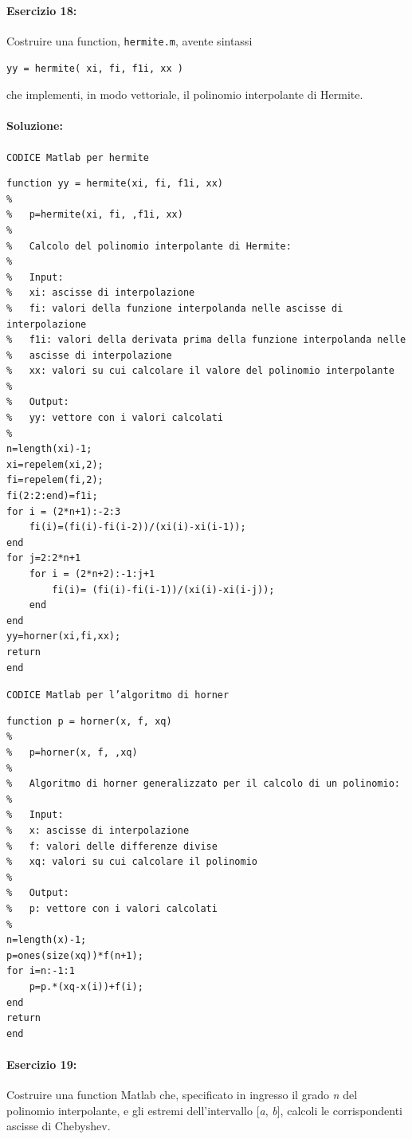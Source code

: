 \documentclass[12pt]{article}
\begin{document}
\paragraph{Esercizio 18:}
Costruire una function, \texttt{hermite.m}, avente sintassi
\begin{center}
    \texttt{yy = hermite( xi, fi, f1i, xx )}
\end{center}
che implementi, in modo vettoriale, il polinomio interpolante di Hermite.
\paragraph{Soluzione:}

\texttt{CODICE Matlab per hermite}
\begin{lstlisting}[frame=single]
function yy = hermite(xi, fi, f1i, xx)
%
%   p=hermite(xi, fi, ,f1i, xx)
%
%   Calcolo del polinomio interpolante di Hermite:
%
%   Input:
%   xi: ascisse di interpolazione
%   fi: valori della funzione interpolanda nelle ascisse di interpolazione
%   f1i: valori della derivata prima della funzione interpolanda nelle
%   ascisse di interpolazione
%   xx: valori su cui calcolare il valore del polinomio interpolante
%
%   Output:
%   yy: vettore con i valori calcolati
%
n=length(xi)-1;
xi=repelem(xi,2);
fi=repelem(fi,2);
fi(2:2:end)=f1i;
for i = (2*n+1):-2:3
    fi(i)=(fi(i)-fi(i-2))/(xi(i)-xi(i-1));
end
for j=2:2*n+1
    for i = (2*n+2):-1:j+1
        fi(i)= (fi(i)-fi(i-1))/(xi(i)-xi(i-j));
    end
end
yy=horner(xi,fi,xx);
return
end
\end{lstlisting}
\texttt{CODICE Matlab per l'algoritmo di horner}
\begin{lstlisting}[frame=single]
function p = horner(x, f, xq)
%
%   p=horner(x, f, ,xq)
%
%   Algoritmo di horner generalizzato per il calcolo di un polinomio:
%
%   Input:
%   x: ascisse di interpolazione
%   f: valori delle differenze divise
%   xq: valori su cui calcolare il polinomio
%
%   Output:
%   p: vettore con i valori calcolati
%
n=length(x)-1;
p=ones(size(xq))*f(n+1);
for i=n:-1:1
    p=p.*(xq-x(i))+f(i);
end
return
end
\end{lstlisting}
\paragraph{Esercizio 19:}
Costruire una function Matlab che, specificato in ingresso il grado \emph{n} del polinomio
interpolante, e gli estremi dell'intervallo [\emph{a}, \emph{b}], calcoli le corrispondenti ascisse di Chebyshev.
\end{document}
